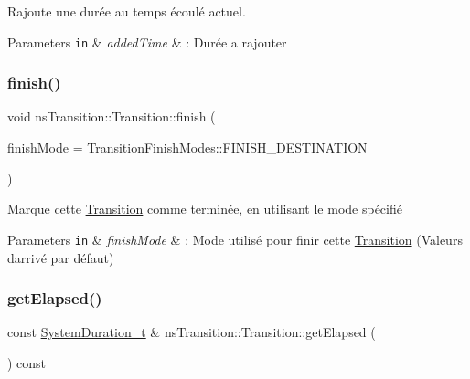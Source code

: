 Rajoute une durée au temps écoulé actuel. 


\begin{DoxyParams}[1]{Parameters}
\mbox{\tt in}  & {\em added\+Time} & \+: Durée a rajouter \\
\hline
\end{DoxyParams}
\mbox{\label{classns_transition_1_1_transition_a8c8c7caf7326e24ffa540093ed12f581}} 
\subsubsection{\texorpdfstring{finish()}{finish()}}
{\footnotesize\ttfamily void ns\+Transition\+::\+Transition\+::finish (\begin{DoxyParamCaption}\item[{const \hyperlink{classns_transition_1_1_transition_a0bf761e331527477ce0c5e496b722a19}{Transition\+Finish\+Modes} \&}]{finish\+Mode = {\ttfamily TransitionFinishModes\+:\+:FINISH\+\_\+DESTINATION} }\end{DoxyParamCaption})}



Marque cette \hyperlink{classns_transition_1_1_transition}{Transition} comme terminée, en utilisant le mode spécifié 


\begin{DoxyParams}[1]{Parameters}
\mbox{\tt in}  & {\em finish\+Mode} & \+: Mode utilisé pour finir cette \hyperlink{classns_transition_1_1_transition}{Transition} (Valeurs d\textquotesingle{}arrivé par défaut) \\
\hline
\end{DoxyParams}
\mbox{\label{classns_transition_1_1_transition_a616e0ef596d4e8ebb185a6cf0a685924}} 
\subsubsection{\texorpdfstring{get\+Elapsed()}{getElapsed()}}
{\footnotesize\ttfamily const \hyperlink{namespacens_transition_a260258f249f46ff9a62da721537f87af}{System\+Duration\+\_\+t} \& ns\+Transition\+::\+Transition\+::get\+Elapsed (\begin{DoxyParamCaption}{ }\end{DoxyParamCaption}) const}



